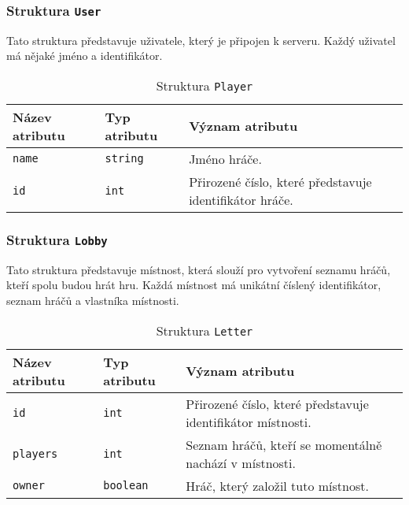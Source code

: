 \documentclass[12pt, a4paper]{article}
\begin{document}
\subsubsection{Struktura \texttt{User}}
Tato struktura představuje uživatele, který je připojen k serveru. Každý uživatel má nějaké jméno a identifikátor.
\begin{center}
		\begin{table}[!ht]
		     \caption{Struktura \texttt{Player}}
		\begin{tabularx}{\textwidth}{|l|l|X|}
			\hline
			\textbf{Název atributu} & \textbf{Typ atributu} & \textbf{Význam atributu} \\ 
			\hline
			\texttt{name}          &\texttt{string}&Jméno hráče. \\
			\hline
  			\texttt{id}          &\texttt{int}&Přirozené číslo, které představuje identifikátor hráče.\\
			\hline
		\end{tabularx}
		\end{table}
\end{center}  

\pagebreak
\subsubsection{Struktura \texttt{Lobby}}
Tato struktura představuje místnost, která slouží pro vytvoření seznamu hráčů, kteří spolu budou hrát hru. Každá místnost má unikátní číslený identifikátor, seznam hráčů a vlastníka místnosti.
\begin{center}
		\begin{table}[!ht]
		     \caption{Struktura \texttt{Letter}}
		\begin{tabularx}{\textwidth}{|l|l|X|}
			\hline
			\textbf{Název atributu} & \textbf{Typ atributu} & \textbf{Význam atributu} \\ 
			\hline
  			\texttt{id}          &\texttt{int}&Přirozené číslo, které představuje identifikátor místnosti.\\
			\hline
  			\texttt{players}          &\texttt{int}&Seznam hráčů, kteří se momentálně nachází v místnosti.\\
			\hline
			\texttt{owner}          &\texttt{boolean}&Hráč, který založil tuto místnost.\\
			\hline
		\end{tabularx}
		\end{table}
\end{center}  
		
\end{document}
